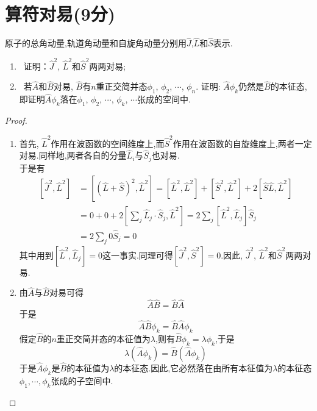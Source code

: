 \documentclass{ctexart}
\begin{document}
\section{算符对易(9分)}
原子的总角动量,轨道角动量和自旋角动量分别用$\hat{J}$,$\hat{L}$和$\hat{S}$表示.
\begin{enumerate}[label=\tbf{\arabic*.}]
    \item {}\ 证明：$\hat{J}^2$, $\hat{L}^2$和$\hat{S}^2$两两对易;
    \item {}\ 若$\hat{A}$和$\hat{B}$对易, $\hat{B}$有$n$重正交简并态$\phi_1$, $\phi_2$, $\cdots$, $\phi_n$. 证明: $\hat{A}\phi_k$仍然是$\hat{B}$的本征态,即证明$\hat{A}\phi_k$落在$\phi_1$, $\phi_2$, $\cdots$, $\phi_k$, $\cdots$张成的空间中.
\end{enumerate}
\begin{proof}
\begin{enumerate}[label=\tbf{\arabic*.}]
    \item 首先, $\hat{L}^2$作用在波函数的空间维度上,而$\hat{S}^2$作用在波函数的自旋维度上,两者一定对易.同样地,两者各自的分量$\hat{L}_i$与$\hat{S}_j$也对易.\\
    \indent 于是有
    \[\begin{aligned}
        \left[\hat{J}^2,\hat{L}^2\right]
        &=\left[\left(\hat{L}+\hat{S}\right)^2,\hat{L}^2\right]=\left[\hat{L}^2,\hat{L}^2\right]+\left[\hat{S}^2,\hat{L}^2\right]+2\left[\hat{S}\hat{L},\hat{L}^2\right]\\
        &=0+0+2\left[\sum_{j}\hat{L}_j\cdot\hat{S}_j,\hat{L}^2\right]=2\sum_{j}\left[\hat{L}^2,\hat{L}_j\right]\hat{S}_j\\
        &=2\sum_{j}0\hat{S}_j=0
    \end{aligned}\]
    其中用到$\left[\hat{L}^2,\hat{L}_j\right]=0$这一事实.同理可得$\left[\hat{J}^2,\hat{S}^2\right]=0$.因此, $\hat{J}^2$, $\hat{L}^2$和$\hat{S}^2$两两对易.
    \item 由$\hat{A}$与$\hat{B}$对易可得
    \[\hat{A}\hat{B}=\hat{B}\hat{A}\]
    于是
    \[\hat{A}\hat{B}\phi_k=\hat{B}\hat{A}\phi_k\]
    假定$\hat{B}$的$n$重正交简并态的本征值为$\lambda$,则有$\hat{B}\phi_k=\lambda\phi_k$,于是
    \[\lambda\left(\hat{A}\phi_k\right)=\hat{B}\left(\hat{A}\phi_k\right)\]
    于是$\hat{A}\phi_k$是$\hat{B}$的本征值为$\lambda$的本征态.因此,它必然落在由所有本征值为$\lambda$的本征态$\phi_1,\cdots,\phi_k$张成的子空间中.
\end{enumerate}
\end{proof}
\end{document}
